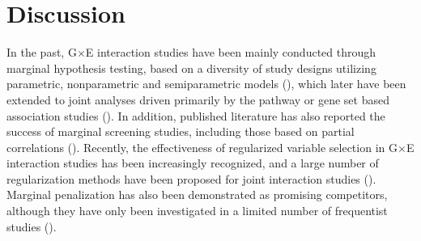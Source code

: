 \documentclass[12pt]{article}
\begin{document}
%


\newpage
\section{Discussion}

In the past, G$\times$E interaction studies have been mainly conducted through marginal hypothesis testing, based on a diversity of study designs utilizing parametric, nonparametric and semiparametric models (\cite{MURC, THOM, MUKB}), which later have been extended to joint analyses driven primarily by the pathway or gene set based association studies (\cite{WUCU, JZS, JHDZ}). In addition, published literature has also reported the success of marginal screening studies, including those based on partial correlations (\cite{XWZ, NHZ}).
Recently, the effectiveness of regularized variable selection in G$\times$E interaction studies has been increasingly recognized, and a large number of regularization methods have been proposed for joint interaction studies (\cite{ZFR}). Marginal penalization has also been demonstrated as promising competitors, although they have only been investigated in a limited number of frequentist studies (\cite{SLH, ZSX, CZJ}).
\end{document}
